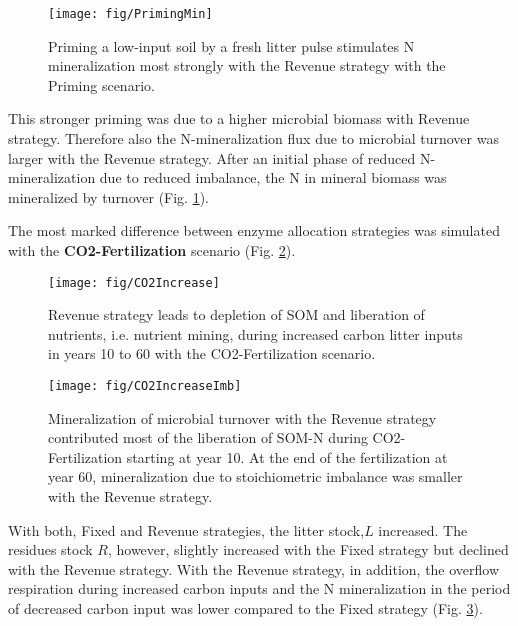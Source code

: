\begin{figure}[t]
\vspace*{2mm}
\begin{center}
\texttt{[image: fig/PrimingMin]}
\end{center}
\caption{Priming a low-input soil by a fresh litter pulse stimulates N
mineralization most strongly with the Revenue strategy with the Priming scenario.
\label{fig:PrimingMin}}
\end{figure}

This stronger priming was due to a higher microbial biomass with Revenue
strategy. Therefore also the N-mineralization flux due to microbial turnover
was larger with the Revenue strategy. After an initial phase of reduced
N-mineralization due to reduced imbalance, the N in mineral biomass was
mineralized by turnover (Fig. \ref{fig:PrimingMin}).

The most marked difference between enzyme allocation strategies was simulated
with the \textbf{CO2-Fertilization} scenario (Fig. \ref{fig:CO2Increase}).
\begin{figure}[t] \vspace*{2mm}
\begin{center}
\texttt{[image: fig/CO2Increase]}
\end{center}
\caption{
Revenue strategy leads to depletion of SOM and liberation of nutrients, i.e.
nutrient mining, during increased carbon litter inputs
in years 10 to 60 with the CO2-Fertilization scenario.
\label{fig:CO2Increase}}

\end{figure}
\begin{figure}[t] \vspace*{2mm}
\begin{center}
\texttt{[image: fig/CO2IncreaseImb]} 
\end{center}
\caption{
Mineralization of microbial turnover with the Revenue strategy
contributed most of the liberation of SOM-N during CO2-Fertilization starting
at year 10.
At the end of the fertilization at year 60, mineralization due to stoichiometric
imbalance was smaller with the Revenue strategy.
\label{fig:CO2IncreaseImb}}
\end{figure}
With both, Fixed and Revenue strategies, the litter stock,$L$ increased. The
residues stock $R$, however, slightly increased with the Fixed strategy but
declined with the Revenue strategy. With the Revenue strategy, in addition, the
overflow respiration during increased carbon inputs and the N mineralization
in the period of decreased carbon input was lower compared to the Fixed
strategy (Fig. \ref{fig:CO2IncreaseImb}).

